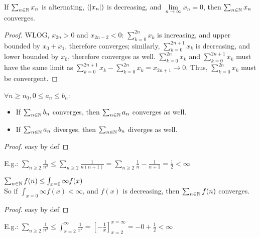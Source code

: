 \begin{property}
	If $\sum_{n \in \mathbb{N}} x_n$ is alternating, $(| x_n |)$ is decreasing, and $\lim\limits_{n \to \infty} x_n = 0$, then $\sum_{n \in \mathbb{N}} x_n$ converges.
\end{property}
\begin{proof}
	WLOG, $x_{2n}>0$ and $x_{2n-2}<0$:
	$\sum_{k=0}^{2n} x_k$ is increasing, and upper bounded by $x_0+x_1$, therefore converges;
	similarly, $\sum_{k=0}^{2n+1} x_k$ is decreasing, and lower bounded by $x_0$, therefore converges as well.
	$\sum_{k=0}^{2n} x_k$ and $\sum_{k=0}^{2n+1} x_k$ must have the same limit as $\sum_{k=0}^{2n+1} x_k - \sum_{k=0}^{2n} x_k = x_{2n+1} \to 0$.
	Thus, $\sum_{k=0}^{2n} x_k$ must be convergent.
\end{proof}

\begin{property}
	$\forall n \geq n_0, 0 \leq a_n \leq b_n$:
	\begin{itemize}
		\item If $\sum_{n \in \mathbb{N}} b_n$ converges, then $\sum_{n \in \mathbb{N}} a_n$ converges as well.
		\item If $\sum_{n \in \mathbb{N}} a_n$ diverges, then $\sum_{n \in \mathbb{N}} b_n$ diverges as well.
	\end{itemize}
\end{property}
\begin{proof}
	easy by def
\end{proof}
E.g.: $\sum_{n \geq 2} \frac{1}{n^2}
\leq \sum_{n \geq 2} \frac{1}{n(n+1)}
= \sum_{n \geq 2} \frac{1}{n}-\frac{1}{n+1}
= \frac{1}{2} < \infty$

\begin{property}
	$\sum_{n \in \mathbb{N}} f(n) \leq \int_{x=0}{\infty} f(x)$\\
	So if $\int_{x=0}{\infty} f(x) < \infty$, and $f(x)$ is decreasing, then $\sum_{n \in \mathbb{N}} f(n)$ converges.
\end{property}
\begin{proof}
	easy by def
\end{proof}
E.g.: $\sum_{n \geq 2} \frac{1}{n^2}
\leq \int_{x = 2}^{\infty} \frac{1}{x^2}
= \left[ -\frac{1}{x} \right]_{x=2}^{x=\infty}
= -0 +\frac{1}{2} < \infty$


